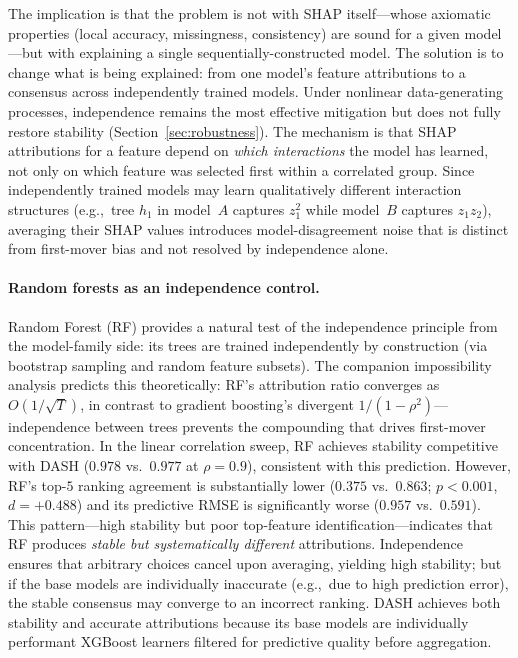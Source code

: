 \documentclass[11pt]{article}
\newcommand{\dash}{\textsc{DASH}}
\newcommand{\rhovar}{\rho}
\newcommand{\eg}{e.g.,\ }
\begin{document}
The implication is that the problem is not with SHAP itself---whose
axiomatic properties (local accuracy, missingness, consistency) are
sound for a given model---but with explaining a single
sequentially-constructed model. The solution is to change what is
being explained: from one model's feature attributions to a consensus
across independently trained models. Under nonlinear data-generating
processes, independence remains the most effective mitigation but does
not fully restore stability (Section~\ref{sec:robustness}). The
mechanism is that SHAP attributions for a feature depend on \emph{which
interactions} the model has learned, not only on which feature was
selected first within a correlated group. Since independently trained
models may learn qualitatively different interaction structures
(\eg tree $h_1$ in model~$A$ captures $z_1^2$ while model~$B$ captures
$z_1 z_2$), averaging their SHAP values introduces model-disagreement
noise that is distinct from first-mover bias and not resolved by
independence alone.

\paragraph{Random forests as an independence control.}
Random Forest (RF) provides a natural test of the independence principle
from the model-family side: its trees are trained independently by
construction (via bootstrap sampling and random feature subsets).
The companion impossibility analysis \citep{caraker2026impossibility}
predicts this theoretically: RF's attribution ratio converges as
$O(1/\sqrt{T})$, in contrast to gradient boosting's divergent
$1/(1 - \rhovar^2)$---independence between trees prevents the
compounding that drives first-mover concentration. In the
linear correlation sweep, RF achieves stability competitive with
\dash{} ($0.978$ vs.\ $0.977$ at $\rhovar = 0.9$), consistent with
this prediction. However, RF's
top-$5$ ranking agreement is substantially lower ($0.375$ vs.\ $0.863$;
$p < 0.001$, $d = +0.488$) and its predictive RMSE is significantly
worse ($0.957$ vs.\ $0.591$). This pattern---high stability but poor
top-feature identification---indicates that RF produces \emph{stable
but systematically different} attributions. Independence ensures that
arbitrary choices cancel upon averaging, yielding high stability; but
if the base models are individually inaccurate (\eg due to high
prediction error), the stable consensus may converge to an incorrect
ranking. \dash{} achieves both stability and accurate attributions
because its base models are individually performant XGBoost learners
filtered for predictive quality before aggregation.
\end{document}
